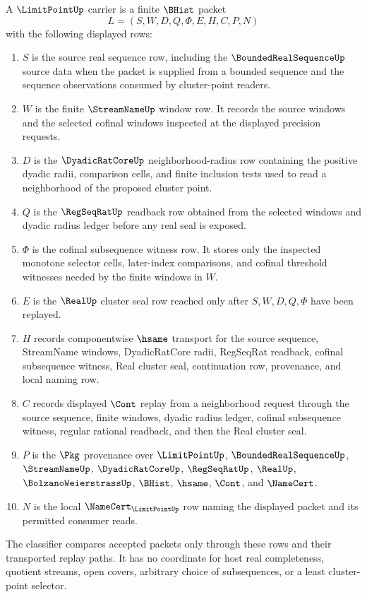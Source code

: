 \begin{definition}
\label{def:limitpoint-carrier}
A $\LimitPointUp$ carrier is a finite $\BHist$ packet
$$
L=(S,W,D,Q,\Phi,E,H,C,P,N)
$$
with the following displayed rows:
\begin{enumerate}
\item $S$ is the source real sequence row, including the $\BoundedRealSequenceUp$ source data when the packet is supplied from a bounded sequence and the sequence observations consumed by cluster-point readers.
\item $W$ is the finite $\StreamNameUp$ window row. It records the source windows and the selected cofinal windows inspected at the displayed precision requests.
\item $D$ is the $\DyadicRatCoreUp$ neighborhood-radius row containing the positive dyadic radii, comparison cells, and finite inclusion tests used to read a neighborhood of the proposed cluster point.
\item $Q$ is the $\RegSeqRatUp$ readback row obtained from the selected windows and dyadic radius ledger before any real seal is exposed.
\item $\Phi$ is the cofinal subsequence witness row. It stores only the inspected monotone selector cells, later-index comparisons, and cofinal threshold witnesses needed by the finite windows in $W$.
\item $E$ is the $\RealUp$ cluster seal row reached only after $S,W,D,Q,\Phi$ have been replayed.
\item $H$ records componentwise $\hsame$ transport for the source sequence, StreamName windows, DyadicRatCore radii, RegSeqRat readback, cofinal subsequence witness, Real cluster seal, continuation row, provenance, and local naming row.
\item $C$ records displayed $\Cont$ replay from a neighborhood request through the source sequence, finite windows, dyadic radius ledger, cofinal subsequence witness, regular rational readback, and then the Real cluster seal.
\item $P$ is the $\Pkg$ provenance over $\LimitPointUp$, $\BoundedRealSequenceUp$, $\StreamNameUp$, $\DyadicRatCoreUp$, $\RegSeqRatUp$, $\RealUp$, $\BolzanoWeierstrassUp$, $\BHist$, $\hsame$, $\Cont$, and $\NameCert$.
\item $N$ is the local $\NameCert_{\LimitPointUp}$ row naming the displayed packet and its permitted consumer reads.
\end{enumerate}
The classifier compares accepted packets only through these rows and their transported replay paths. It has no coordinate for host real completeness, quotient streams, open covers, arbitrary choice of subsequences, or a least cluster-point selector.
\end{definition}

